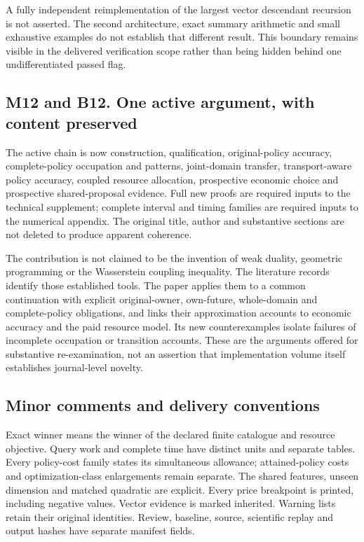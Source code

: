 A fully independent reimplementation of the largest vector descendant
recursion is not asserted. The second architecture, exact summary
arithmetic and small exhaustive examples do not establish that different
result. This boundary remains visible in the delivered verification
scope rather than being hidden behind one undifferentiated passed flag.

\hypertarget{m12-and-b12.-one-active-argument-with-content-preserved}{%
\subsection{M12 and B12. One active argument, with content
preserved}\label{m12-and-b12.-one-active-argument-with-content-preserved}}

The active chain is now construction, qualification, original-policy
accuracy, complete-policy occupation and patterns, joint-domain
transfer, transport-aware policy accuracy, coupled resource allocation,
prospective economic choice and prospective shared-proposal evidence.
Full new proofs are required inputs to the technical supplement;
complete interval and timing families are required inputs to the
numerical appendix. The original title, author and substantive sections
are not deleted to produce apparent coherence.

The contribution is not claimed to be the invention of weak duality,
geometric programming or the Wasserstein coupling inequality. The
literature records identify those established tools. The paper applies
them to a common continuation with explicit original-owner, own-future,
whole-domain and complete-policy obligations, and links their
approximation accounts to economic accuracy and the paid resource model.
Its new counterexamples isolate failures of incomplete occupation or
transition accounts. These are the arguments offered for substantive
re-examination, not an assertion that implementation volume itself
establishes journal-level novelty.

\hypertarget{minor-comments-and-delivery-conventions}{%
\subsection{Minor comments and delivery
conventions}\label{minor-comments-and-delivery-conventions}}

Exact winner means the winner of the declared finite catalogue and
resource objective. Query work and complete time have distinct units and
separate tables. Every policy-cost family states its simultaneous
allowance; attained-policy costs and optimization-class enlargements
remain separate. The shared features, unseen dimension and matched
quadratic are explicit. Every price breakpoint is printed, including
negative values. Vector evidence is marked inherited. Warning lists
retain their original identities. Review, baseline, source, scientific
replay and output hashes have separate manifest fields.

